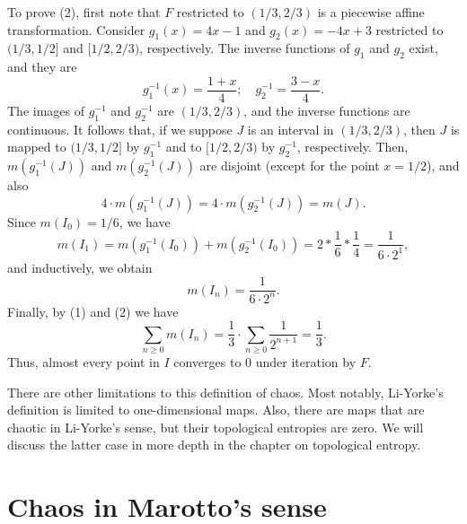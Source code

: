 \documentclass[12pt,draft,twoside]{book}
\begin{document}
\begin{example}
%
To prove (2), first note that $F$ restricted to $(1/3, 2/3)$ is a piecewise affine transformation.
Consider $g_1(x) = 4x - 1$ and $g_2(x) = -4x + 3$ restricted to $(1/3,1/2]$ and $[1/2,2/3)$, respectively.
The inverse functions of $g_1$ and $g_2$ exist, and they are
\begin{equation*}
  g_1^{-1}(x) = \frac{1+x}{4}; \quad g_2^{-1} = \frac{3-x}{4}.
\end{equation*}
The images of $g_1^{-1}$ and $g_2^{-1}$ are $(1/3,2/3)$, and the inverse functions are continuous.
It follows that, if we suppose $J$ is an interval in $(1/3,2/3)$, then $J$ is mapped to $(1/3,1/2]$ by $g_1^{-1}$ and to $[1/2,2/3)$ by $g_2^{-1}$, respectively.
Then, $m(g_1^{-1}(J))$ and $m(g_2^{-1}(J))$ are disjoint (except for the point $x = 1/2$), and also
\begin{equation*}
  4 \cdot m(g_1^{-1}(J)) = 4 \cdot m(g_2^{-1}(J)) = m(J).
\end{equation*}
Since $m(I_0) = 1/6$, we have
\begin{equation*}
  m(I_1) 
  = m(g_1^{-1}(I_0)) + m(g_2^{-1}(I_0))
  = 2 * \frac{1}{6} * \frac{1}{4}
  = \frac{1}{6\cdot 2^1},
\end{equation*}
and inductively, we obtain
\begin{equation*}
  m(I_n) = \frac{1}{6 \cdot 2^n}.
\end{equation*}
%
Finally, by (1) and (2) we have
\begin{equation*}
  \sum\limits_{n\geq 0} m(I_n)
  = \frac{1}{3} \cdot \sum\limits_{n\geq 0} \frac{1}{2^{n+1}}
  = \frac{1}{3}.
\end{equation*}
Thus, almost every point in $I$ converges to 0 under iteration by $F$.
\end{example}


There are other limitations to this definition of chaos.
Most notably, Li-Yorke's definition is limited to one-dimensional maps.
Also, there are maps that are chaotic in Li-Yorke's sense, but their topological entropies are zero.
We will discuss the latter case in more depth in the chapter on topological entropy.

\section{Chaos in Marotto's sense}
\citep{marotto1,marotto2} 
\end{document}
